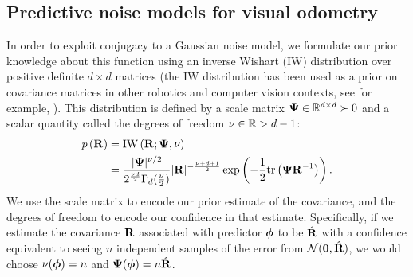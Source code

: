 \subsection{Predictive noise models for visual odometry}
%
%
In
order to exploit conjugacy to a Gaussian noise model, we formulate our prior knowledge
about this function using an inverse Wishart (IW) distribution over positive
definite $d \times d$ matrices (the IW distribution has been used as a prior on covariance matrices in other robotics and computer vision contexts, see for example, \citep{fitzgibbon2007learning}). This distribution is defined by a scale matrix
$\Matrix{\Psi} \in \RealNumbers[d][d]\succ0$ and a scalar quantity called the
degrees of freedom $\nu\in\RealNumbers>d-1$:
\begin{align}
  p\left(\boldsymbol{\mathbf{R}}\right) &= \text{IW}
  \left(\boldsymbol{\mathbf{R}}; \boldsymbol{\mathbf{\Psi}}, \nu\right)  \\ 
  &= \frac{\vert\boldsymbol{\mathbf{\Psi}}\vert^{\nu/2}}{2^{\frac{\nu
  d}{2}}\Gamma_d(\frac{\nu}{2})} \vert\boldsymbol{\mathbf{R}}\vert
  ^{-\frac{\nu+d+1}{2}} \exp\left( -\frac{1}{2} \text{tr}\left(\boldsymbol{\mathbf{\Psi}}
  \boldsymbol{\mathbf{R}}^{-1}\right)\right) \nonumber.
\end{align}
We use the scale matrix to encode our prior estimate of the
covariance, and the degrees of freedom to encode our confidence in
that estimate.  Specifically, if we estimate the covariance $\boldsymbol{\mathbf{R}}$
associated with predictor $\boldsymbol{\mathbf{\phi}}$ to be $\hat{\boldsymbol{\mathbf{R}}}$ with a
confidence equivalent to seeing $n$ independent samples of the error from
$\mathcal{N}(\boldsymbol{\mathbf{0}}, \hat{\boldsymbol{\mathbf{R}}})$, we would choose
$\nu(\boldsymbol{\mathbf{\phi}})=n$ and $\boldsymbol{\mathbf{\Psi}}(\boldsymbol{\mathbf{\phi}})=n\hat{\boldsymbol{\mathbf{R}}}$.

